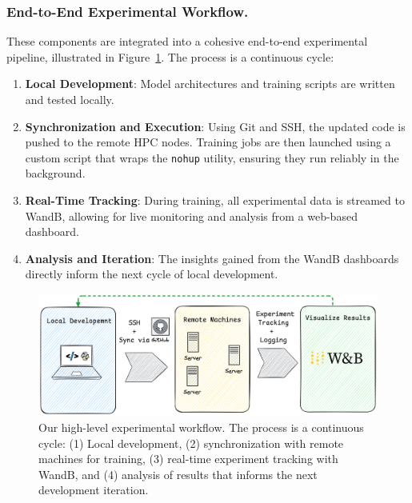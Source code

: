 \documentclass[../Main.tex]{subfiles}
\begin{document}
\subsubsection{End-to-End Experimental Workflow.}
These components are integrated into a cohesive end-to-end experimental pipeline, illustrated in Figure~\ref{fig:workflow}. The process is a continuous cycle:
\begin{enumerate}
    \item \textbf{Local Development}: Model architectures and training scripts are written and tested locally.
    \item \textbf{Synchronization and Execution}: Using Git and SSH, the updated code is pushed to the remote HPC nodes. Training jobs are then launched using a custom script that wraps the \texttt{nohup} utility, ensuring they run reliably in the background.
    \item \textbf{Real-Time Tracking}: During training, all experimental data is streamed to WandB, allowing for live monitoring and analysis from a web-based dashboard.
    \item \textbf{Analysis and Iteration}: The insights gained from the WandB dashboards directly inform the next cycle of local development.
\end{enumerate}

\begin{figure}[H]
    \centering
    \includegraphics[width=0.9\linewidth]{img/workflow.png}
    \caption{Our high-level experimental workflow. The process is a continuous cycle: (1) Local development, (2) synchronization with remote machines for training, (3) real-time experiment tracking with WandB, and (4) analysis of results that informs the next development iteration.}
    \label{fig:workflow}
\end{figure}
\end{document}
